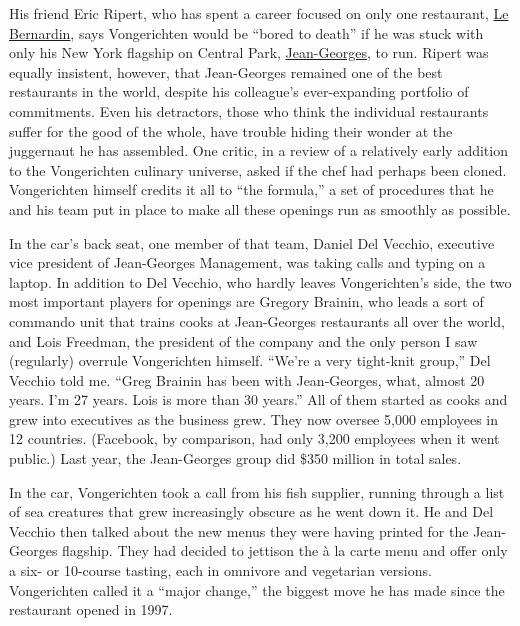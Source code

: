 His friend Eric Ripert, who has spent a career focused on only one
restaurant,
\href{https://www.nytimes3xbfgragh.onion/2012/05/23/dining/reviews/le-bernardin-in-midtown-manhattan.html}{Le
Bernardin}, says Vongerichten would be ``bored to death'' if he was
stuck with only his New York flagship on Central Park,
\href{https://www.nytimes3xbfgragh.onion/2014/04/09/dining/restaurant-review-jean-georges-on-the-upper-west-side.html}{Jean-Georges},
to run. Ripert was equally insistent, however, that Jean-Georges
remained one of the best restaurants in the world, despite his
colleague's ever-expanding portfolio of commitments. Even his
detractors, those who think the individual restaurants suffer for the
good of the whole, have trouble hiding their wonder at the juggernaut he
has assembled. One critic, in a review of a relatively early addition to
the Vongerichten culinary universe, asked if the chef had perhaps been
cloned. Vongerichten himself credits it all to ``the formula,'' a set of
procedures that he and his team put in place to make all these openings
run as smoothly as possible.

In the car's back seat, one member of that team, Daniel Del Vecchio,
executive vice president of Jean-Georges Management, was taking calls
and typing on a laptop. In addition to Del Vecchio, who hardly leaves
Vongerichten's side, the two most important players for openings are
Gregory Brainin, who leads a sort of commando unit that trains cooks at
Jean-Georges restaurants all over the world, and Lois Freedman, the
president of the company and the only person I saw (regularly) overrule
Vongerichten himself. ``We're a very tight-knit group,'' Del Vecchio
told me. ``Greg Brainin has been with Jean-Georges, what, almost 20
years. I'm 27 years. Lois is more than 30 years.'' All of them started
as cooks and grew into executives as the business grew. They now oversee
5,000 employees in 12 countries. (Facebook, by comparison, had only
3,200 employees when it went public.) Last year, the Jean-Georges group
did \$350 million in total sales.

In the car, Vongerichten took a call from his fish supplier, running
through a list of sea creatures that grew increasingly obscure as he
went down it. He and Del Vecchio then talked about the new menus they
were having printed for the Jean-Georges flagship. They had decided to
jettison the à la carte menu and offer only a six- or 10-course tasting,
each in omnivore and vegetarian versions. Vongerichten called it a
``major change,'' the biggest move he has made since the restaurant
opened in 1997.

